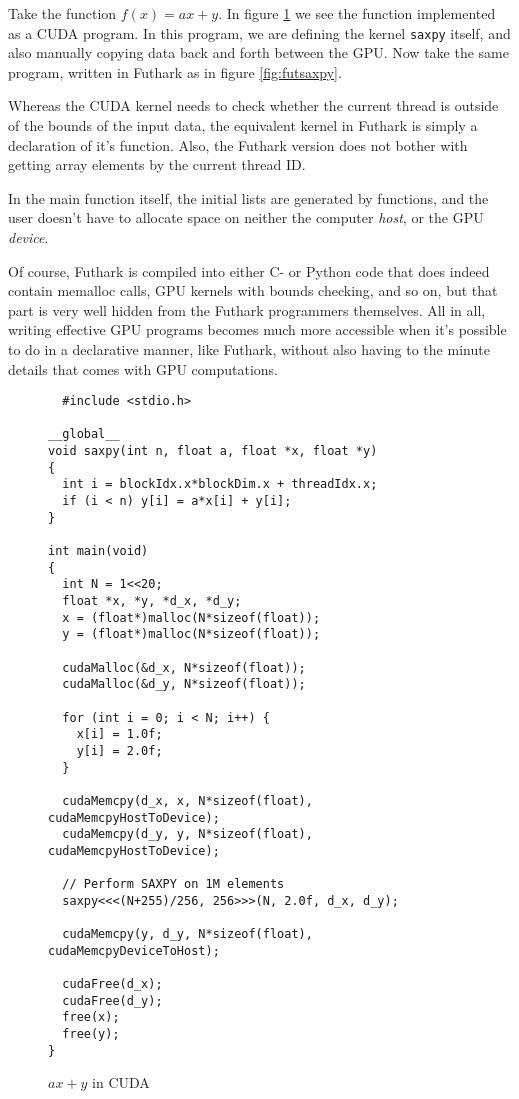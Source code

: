 Take the function $f(x) = ax+y$. In figure \ref{fig:cudasaxpy} we see the
function implemented as a CUDA program. In this program, we are defining the
kernel \texttt{saxpy} itself, and also manually copying data back and forth
between the GPU.
Now take the same program, written in Futhark as in figure \ref{fig:futsaxpy}.

Whereas the CUDA kernel needs to check whether the current thread is outside of
the bounds of the input data, the equivalent kernel in Futhark is simply a
declaration of it's function. Also, the Futhark version does not bother with
getting array elements by the current thread ID.

In the main function itself, the initial lists are generated by functions, and
the user doesn't have to allocate space on neither the computer \textit{host},
or the GPU \textit{device}.

Of course, Futhark is compiled into either C- or Python code that does indeed
contain memalloc calls, GPU kernels with bounds checking, and so on, but that
part is very well hidden from the Futhark programmers themselves.
All in all, writing effective GPU programs becomes much more accessible when it's
possible to do in a declarative manner, like Futhark, without also having to
the minute details that comes with GPU computations.
\begin{figure}
  \centering
\begin{verbatim}
  #include <stdio.h>

__global__
void saxpy(int n, float a, float *x, float *y)
{
  int i = blockIdx.x*blockDim.x + threadIdx.x;
  if (i < n) y[i] = a*x[i] + y[i];
}

int main(void)
{
  int N = 1<<20;
  float *x, *y, *d_x, *d_y;
  x = (float*)malloc(N*sizeof(float));
  y = (float*)malloc(N*sizeof(float));

  cudaMalloc(&d_x, N*sizeof(float)); 
  cudaMalloc(&d_y, N*sizeof(float));

  for (int i = 0; i < N; i++) {
    x[i] = 1.0f;
    y[i] = 2.0f;
  }

  cudaMemcpy(d_x, x, N*sizeof(float), cudaMemcpyHostToDevice);
  cudaMemcpy(d_y, y, N*sizeof(float), cudaMemcpyHostToDevice);

  // Perform SAXPY on 1M elements
  saxpy<<<(N+255)/256, 256>>>(N, 2.0f, d_x, d_y);

  cudaMemcpy(y, d_y, N*sizeof(float), cudaMemcpyDeviceToHost);

  cudaFree(d_x);
  cudaFree(d_y);
  free(x);
  free(y);
}
\end{verbatim}
  \caption{$ax + y$ in CUDA}
  \label{fig:cudasaxpy}
\end{figure}

